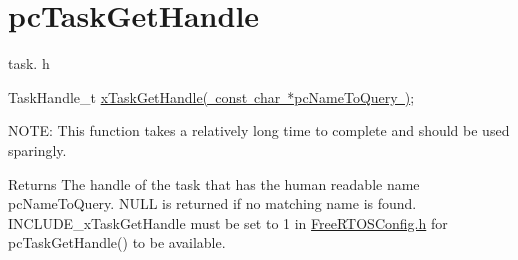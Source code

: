 \hypertarget{group__pc_task_get_handle}{}\section{pc\+Task\+Get\+Handle}
\label{group__pc_task_get_handle}
task. h 
\begin{DoxyPre}TaskHandle\_t \mbox{\hyperlink{task_8h_a45b3b1cd0227269609499beeeb8c5c26}{xTaskGetHandle( const char *pcNameToQuery )}};\end{DoxyPre}


N\+O\+TE\+: This function takes a relatively long time to complete and should be used sparingly.

\begin{DoxyReturn}{Returns}
The handle of the task that has the human readable name pc\+Name\+To\+Query. N\+U\+LL is returned if no matching name is found. I\+N\+C\+L\+U\+D\+E\+\_\+x\+Task\+Get\+Handle must be set to 1 in \mbox{\hyperlink{_free_r_t_o_s_config_8h}{Free\+R\+T\+O\+S\+Config.\+h}} for pc\+Task\+Get\+Handle() to be available. 
\end{DoxyReturn}
